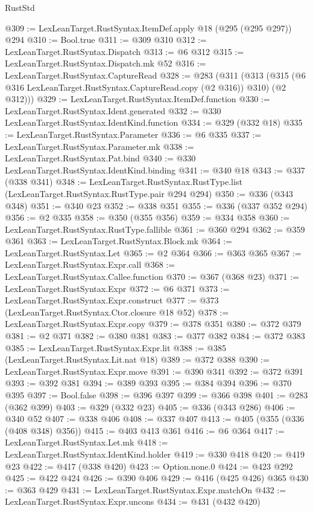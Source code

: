 \begin{lexlean}{RustStd}
\begin{coremodule}
@309 := LexLeanTarget.RustSyntax.ItemDef.apply @18 (@295 (@295 @297)) @294
@310 := Bool.true
@311 := @309 @310
@312 := LexLeanTarget.RustSyntax.Dispatch
@313 := @6 @312
@315 := LexLeanTarget.RustSyntax.Dispatch.mk @52
@316 := LexLeanTarget.RustSyntax.CaptureRead
@328 := @283
    (@311
      (@313 (@315 (@6 @316 LexLeanTarget.RustSyntax.CaptureRead.copy (@2 @316)) @310) (@2 @312)))
@329 := LexLeanTarget.RustSyntax.ItemDef.function
@330 := LexLeanTarget.RustSyntax.Ident.generated
@332 := @330 LexLeanTarget.RustSyntax.IdentKind.function
@334 := @329 (@332 @18)
@335 := LexLeanTarget.RustSyntax.Parameter
@336 := @6 @335
@337 := LexLeanTarget.RustSyntax.Parameter.mk
@338 := LexLeanTarget.RustSyntax.Pat.bind
@340 := @330 LexLeanTarget.RustSyntax.IdentKind.binding
@341 := @340 @18
@343 := @337 (@338 @341)
@348 := LexLeanTarget.RustSyntax.RustType.list (LexLeanTarget.RustSyntax.RustType.pair @294 @294)
@350 := @336 (@343 @348)
@351 := @340 @23
@352 := @338 @351
@355 := @336 (@337 @352 @294)
@356 := @2 @335
@358 := @350 (@355 @356)
@359 := @334 @358
@360 := LexLeanTarget.RustSyntax.RustType.fallible
@361 := @360 @294
@362 := @359 @361
@363 := LexLeanTarget.RustSyntax.Block.mk
@364 := LexLeanTarget.RustSyntax.Let
@365 := @2 @364
@366 := @363 @365
@367 := LexLeanTarget.RustSyntax.Expr.call
@368 := LexLeanTarget.RustSyntax.Callee.function
@370 := @367 (@368 @23)
@371 := LexLeanTarget.RustSyntax.Expr
@372 := @6 @371
@373 := LexLeanTarget.RustSyntax.Expr.construct
@377 := @373 (LexLeanTarget.RustSyntax.Ctor.closure @18 @52)
@378 := LexLeanTarget.RustSyntax.Expr.copy
@379 := @378 @351
@380 := @372 @379
@381 := @2 @371
@382 := @380 @381
@383 := @377 @382
@384 := @372 @383
@385 := LexLeanTarget.RustSyntax.Expr.lit
@388 := @385 (LexLeanTarget.RustSyntax.Lit.nat @18)
@389 := @372 @388
@390 := LexLeanTarget.RustSyntax.Expr.move
@391 := @390 @341
@392 := @372 @391
@393 := @392 @381
@394 := @389 @393
@395 := @384 @394
@396 := @370 @395
@397 := Bool.false
@398 := @396 @397
@399 := @366 @398
@401 := @283 (@362 @399)
@403 := @329 (@332 @23)
@405 := @336 (@343 @286)
@406 := @340 @52
@407 := @338 @406
@408 := @337 @407
@413 := @405 (@355 (@336 (@408 @348) @356))
@415 := @403 @413 @361
@416 := @6 @364
@417 := LexLeanTarget.RustSyntax.Let.mk
@418 := LexLeanTarget.RustSyntax.IdentKind.holder
@419 := @330 @418
@420 := @419 @23
@422 := @417 (@338 @420)
@423 := Option.none.{0}
@424 := @423 @292
@425 := @422 @424
@426 := @390 @406
@429 := @416 (@425 @426) @365
@430 := @363 @429
@431 := LexLeanTarget.RustSyntax.Expr.matchOn
@432 := LexLeanTarget.RustSyntax.Expr.uncons
@434 := @431 (@432 @420)

\end{coremodule}
\end{lexlean}
